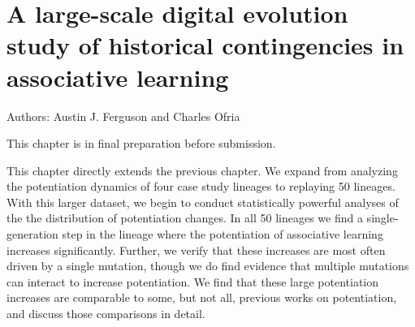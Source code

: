
\chapter{A large-scale digital evolution study of historical contingencies in associative learning}

\label{chap:learning_distributions}

\noindent
Authors: Austin J. Ferguson and Charles Ofria 

\noindent This chapter is in final preparation before submission.

This chapter directly extends the previous chapter. 
We expand from analyzing the potentiation dynamics of four case study lineages to replaying 50 lineages.
With this larger dataset, we begin to conduct statistically powerful analyses of the the distribution of potentiation changes. 
In all 50 lineages we find a single-generation step in the lineage where the potentiation of associative learning increases significantly. 
Further, we verify that these increases are most often driven by a single mutation, though we do find evidence that multiple mutations can interact to increase potentiation. 
We find that these large potentiation increases are comparable to some, but not all, previous works on potentiation, and discuss those comparisons in detail. 



